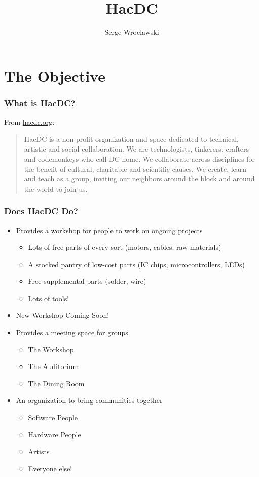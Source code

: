\documentclass[notes]{beamer}
\title{HacDC}
\author{Serge Wroclawski}
\begin{document}
\section{The Objective}

\begin{frame}
  \frametitle{What is HacDC?}
  From \href{http://www.hacdc.org}{hacdc.org}:
  \begin{quote}
    HacDC is a non-profit organization and space dedicated to
    technical, artistic and social collaboration. We are
    technologists, tinkerers, crafters and codemonkeys who call DC
    home. We collaborate across disciplines for the benefit of
    cultural, charitable and scientific causes. We create, learn and
    teach as a group, inviting our neighbors around the block and
    around the world to join us.
  \end{quote}
\end{frame}

\begin{frame}
  \frametitle{Does HacDC Do?}
  \begin{itemize}
  \item Provides a workshop for people to work on ongoing projects
    \begin{itemize}
    \item Lots of free parts of every sort (motors, cables, raw materials)
    \item A stocked pantry of low-cost parts (IC chips, microcontrollers, LEDs)
    \item Free supplemental parts (solder, wire)
    \item Lots of tools!
    \end{itemize}
  \item New Workshop Coming Soon!
  \item Provides a meeting space for groups
    \begin{itemize}
    \item The Workshop
    \item The Auditorium
    \item The Dining Room
    \end{itemize}
  \item An organization to bring communities together
    \begin{itemize}
    \item Software People
    \item Hardware People
    \item Artists
    \item Everyone else!
    \end{itemize}
  \end{itemize}
\end{frame}



\end{document}
